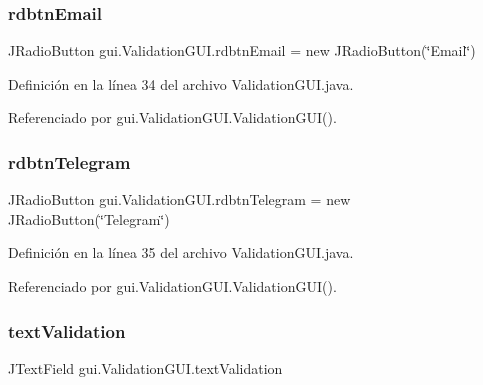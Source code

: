 \subsubsection{\texorpdfstring{rdbtnEmail}{rdbtnEmail}}
{\footnotesize\ttfamily J\+Radio\+Button gui.\+Validation\+G\+U\+I.\+rdbtn\+Email = new J\+Radio\+Button(\char`\"{}Email\char`\"{})\hspace{0.3cm}{\ttfamily [private]}}



Definición en la línea 34 del archivo Validation\+G\+U\+I.\+java.



Referenciado por gui.\+Validation\+G\+U\+I.\+Validation\+G\+U\+I().

\mbox{\label{classgui_1_1_validation_g_u_i_a440c0ddbf9342ed8d877847800ab4182}} 
\subsubsection{\texorpdfstring{rdbtnTelegram}{rdbtnTelegram}}
{\footnotesize\ttfamily J\+Radio\+Button gui.\+Validation\+G\+U\+I.\+rdbtn\+Telegram = new J\+Radio\+Button(\char`\"{}Telegram\char`\"{})\hspace{0.3cm}{\ttfamily [private]}}



Definición en la línea 35 del archivo Validation\+G\+U\+I.\+java.



Referenciado por gui.\+Validation\+G\+U\+I.\+Validation\+G\+U\+I().

\mbox{\label{classgui_1_1_validation_g_u_i_a0b6679a6247a162176dadd092fbd9bd2}} 
\subsubsection{\texorpdfstring{textValidation}{textValidation}}
{\footnotesize\ttfamily J\+Text\+Field gui.\+Validation\+G\+U\+I.\+text\+Validation\hspace{0.3cm}{\ttfamily [private]}}



